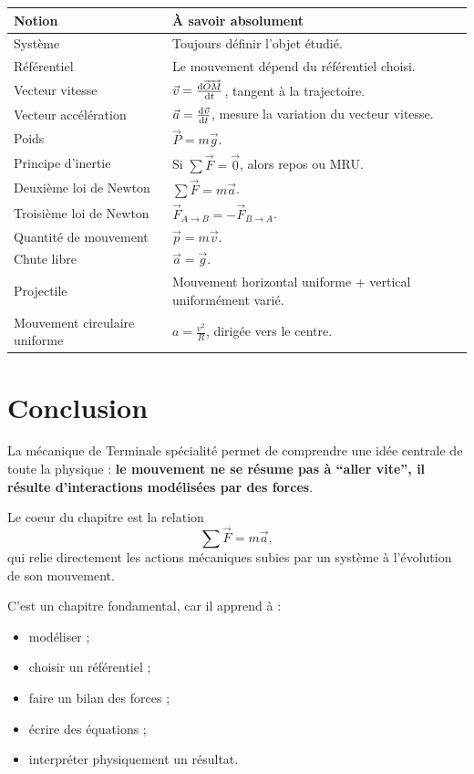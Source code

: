 \documentclass[11pt,a4paper]{article}
\theoremstyle{definition}
\theoremstyle{plain}
\theoremstyle{remark}
\newcommand{\OM}{\overrightarrow{OM}}
\begin{document}
\begin{center}
\renewcommand{\arraystretch}{1.6}
\begin{tabularx}{\textwidth}{|>{\raggedright\arraybackslash}p{4.6cm}|X|}
\hline
\textbf{Notion} & \textbf{À savoir absolument} \\
\hline
Système & Toujours définir l'objet étudié. \\
\hline
Référentiel & Le mouvement dépend du référentiel choisi. \\
\hline
Vecteur vitesse & \(\vec{v}=\dv{\OM}{t}\), tangent à la trajectoire. \\
\hline
Vecteur accélération & \(\vec{a}=\dv{\vec{v}}{t}\), mesure la variation du vecteur vitesse. \\
\hline
Poids & \(\vec{P}=m\vec{g}\). \\
\hline
Principe d'inertie & Si \(\sum \vec{F}=\vec{0}\), alors repos ou MRU. \\
\hline
Deuxième loi de Newton & \(\sum \vec{F}=m\vec{a}\). \\
\hline
Troisième loi de Newton & \(\vec{F}_{A\to B}=-\vec{F}_{B\to A}\). \\
\hline
Quantité de mouvement & \(\vec{p}=m\vec{v}\). \\
\hline
Chute libre & \(\vec{a}=\vec{g}\). \\
\hline
Projectile & Mouvement horizontal uniforme + vertical uniformément varié. \\
\hline
Mouvement circulaire uniforme & \(a=\frac{v^2}{R}\), dirigée vers le centre. \\
\hline
\end{tabularx}
\end{center}

\section*{Conclusion}

La mécanique de Terminale spécialité permet de comprendre une idée centrale de toute la physique : \textbf{le mouvement ne se résume pas à “aller vite”, il résulte d'interactions modélisées par des forces}.  

Le coeur du chapitre est la relation
\[
\sum \vec{F}=m\vec{a},
\]
qui relie directement les actions mécaniques subies par un système à l'évolution de son mouvement.

C'est un chapitre fondamental, car il apprend à :
\begin{itemize}
    \item modéliser ;
    \item choisir un référentiel ;
    \item faire un bilan des forces ;
    \item écrire des équations ;
    \item interpréter physiquement un résultat.
\end{itemize}
\end{document}
